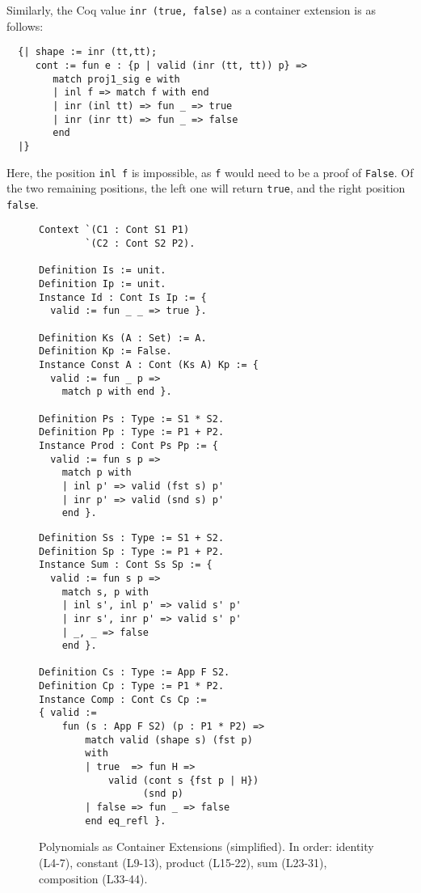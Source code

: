 \documentclass[a4paper, UKenglish, cleveref, autoref, thm-restate]{lipics-v2021}
\begin{document}
Similarly, the Coq value \texttt{inr (true, false)} as a container
extension is as follows:
\begin{verbatim}
  {| shape := inr (tt,tt);
     cont := fun e : {p | valid (inr (tt, tt)) p} =>
        match proj1_sig e with
        | inl f => match f with end
        | inr (inl tt) => fun _ => true
        | inr (inr tt) => fun _ => false
        end
  |}
\end{verbatim}
Here, the position \texttt{inl f} is impossible, as
\texttt{f} would need to be a proof of \texttt{False}.
Of the two remaining positions, the left one will return 
\texttt{true}, and the right position \texttt{false}.
\begin{figure}
\begin{minipage}{.52\textwidth}
  \begin{verbatim}
Context `(C1 : Cont S1 P1) 
        `(C2 : Cont S2 P2).

Definition Is := unit.
Definition Ip := unit.
Instance Id : Cont Is Ip := {
  valid := fun _ _ => true }.

Definition Ks (A : Set) := A.
Definition Kp := False.
Instance Const A : Cont (Ks A) Kp := {
  valid := fun _ p =>
    match p with end }.

Definition Ps : Type := S1 * S2.
Definition Pp : Type := P1 + P2.
Instance Prod : Cont Ps Pp := {
  valid := fun s p => 
    match p with
    | inl p' => valid (fst s) p'
    | inr p' => valid (snd s) p'
    end }.
\end{verbatim}
\end{minipage}
\begin{minipage}{.47\textwidth}
  \begin{verbatim}
Definition Ss : Type := S1 + S2.
Definition Sp : Type := P1 + P2.
Instance Sum : Cont Ss Sp := {
  valid := fun s p => 
    match s, p with
    | inl s', inl p' => valid s' p'
    | inr s', inr p' => valid s' p'
    | _, _ => false
    end }.

Definition Cs : Type := App F S2.
Definition Cp : Type := P1 * P2.
Instance Comp : Cont Cs Cp := 
{ valid :=  
    fun (s : App F S2) (p : P1 * P2) =>
        match valid (shape s) (fst p) 
        with
        | true  => fun H =>
            valid (cont s {fst p | H}) 
                  (snd p)
        | false => fun _ => false
        end eq_refl }.
  \end{verbatim}
\end{minipage}
  \caption{Polynomials as Container Extensions (simplified). In order: identity
  (L4-7), constant (L9-13), product (L15-22), sum (L23-31), composition
  (L33-44).}
  \label{fig:poly}
\end{figure}
\end{document}
